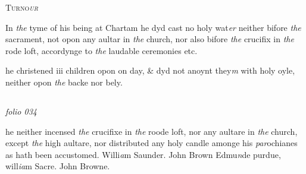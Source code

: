 \documentclass[12pt, a4paper]{book}
\begin{document}
            
            	
				\begin{center} \begin{large} {\scshape Turno\textit{ur}
               } \end{large} \end{center}
			
	
		
			
		
		\ifthenelse{\isodd{\thepage}}
		{\reversemarginpar}
		{\normalmarginpar}
		In \textit{the} tyme of his being at Chartam he dyd cast no holy
 wat\textit{er} neither bifore \textit{the} sacrament, not opon any aultar
 in \textit{the} church, nor also bifore \textit{the} crucifix in \textit{the} rode loft,
 accordynge to \textit{the} laudable ceremonies etc.
            	
				\marginpar[\vspace{0.5cm}{\textcolor{Gray}{holy oyle}}]{}
			
		\ifthenelse{\isodd{\thepage}}
		{\reversemarginpar}
		{\normalmarginpar}
		he christened iii children opon on day, \& dyd not anoynt
 they\textit{m} with holy oyle, neither opon \textit{the} backe nor bely.


\dotfill
					  \subsection*{}  \subsection*{}  \subsection*{}

\textit{folio 034}



 
				\marginpar[\vspace{0.5cm}{\textcolor{Gray}{ceremonies}}]{}
			
		\ifthenelse{\isodd{\thepage}}
		{\reversemarginpar}
		{\normalmarginpar}
		he neither incensed \textit{the} crucifixe in \textit{the} roode loft, nor
 any aultare in \textit{the} church, except \textit{the} high aultare, nor
 distributed any holy candle amonge his\textit{ par}ochianes as
 	hath been accustomed. Willi\textit{a}m Saunder. John Brown
 	Edmu\textit{n}de purdue, will\textit{ia}m Sacre. John Browne.
 
\end{document}
